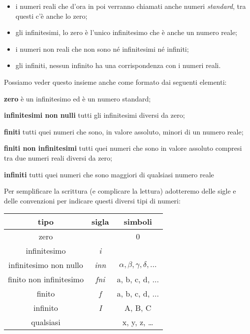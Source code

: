 \begin{itemize}
 \item i numeri reali che d'ora in poi verranno chiamati anche numeri 
\emph{standard}, tra questi c'è anche lo zero;
 \item gli infinitesimi, lo zero è l'unico infinitesimo che è anche un numero 
reale;
 \item i numeri non reali che non sono né infinitesimi né infiniti;
 \item gli infiniti, nessun infinito ha una corrispondenza con i numeri reali.
\end{itemize}

Possiamo veder questo insieme anche come formato dai seguenti elementi:

\begin{description}
 \item \textbf{zero}
 è un infinitesimo ed è un numero standard;
 \item \textbf{infinitesimi non nulli}
 tutti gli infinitesimi diversi da zero;
 \item \textbf{finiti}
 tutti quei numeri che sono, in valore assoluto, minori di un numero reale;
 \item \textbf{finiti non infinitesimi}
 tutti quei numeri che sono in valore assoluto compresi tra due numeri reali 
 diversi da zero;
 \item \textbf{infiniti}
 tutti quei numeri che sono maggiori di qualsiasi numero reale

\end{description}
 
Per semplificare la scrittura (e complicare la lettura) adotteremo delle sigle 
e delle convenzioni per indicare questi diversi tipi di numeri:

\begin{center}
\begin{tabular}{ccc}\toprule
tipo & sigla & simboli\\\midrule
zero &  & 0\\
infinitesimo & \emph{i} & \\
infinitesimo non nullo & \emph{inn} & $\alpha, \beta, \gamma, \delta, \dots$\\
finito non infinitesimo& \emph{fni} & a, b, c, d, ...\\
finito & \emph{f} & a, b, c, d, ...\\
infinito & \emph{I} & A, B, C\\
qualsiasi &  & x, y, z, \ldots\\\bottomrule
\end{tabular}
\label{tab:insnum_tipi}
\end{center}

